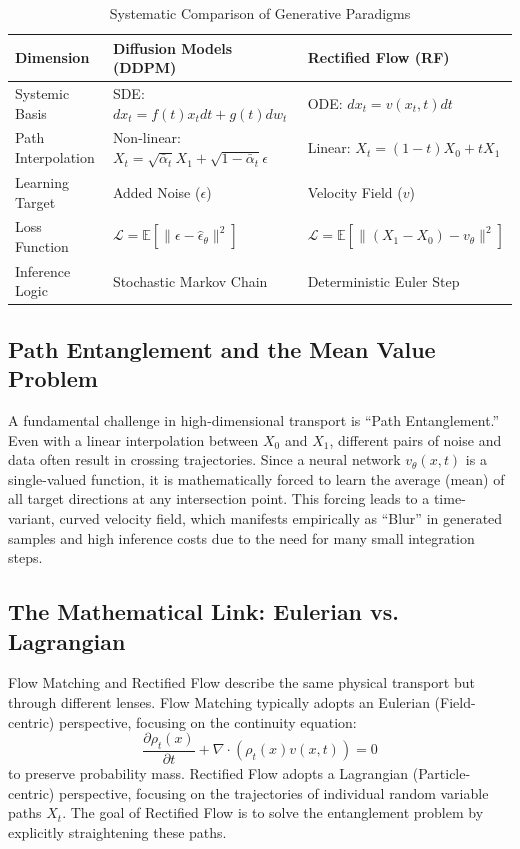 \documentclass[11pt,a4paper]{article}
\begin{document}
\begin{table}[h]
\centering
\caption{Systematic Comparison of Generative Paradigms}
\label{tab:paradigms}
\vspace{0.2cm}
\small
\begin{tabular}{lll}
\toprule
\textbf{Dimension} & \textbf{Diffusion Models (DDPM)} & \textbf{Rectified Flow (RF)} \\
\midrule
Systemic Basis & SDE: $dx_t = f(t)x_t dt + g(t)dw_t$ & ODE: $dx_t = v(x_t, t)dt$ \\
\addlinespace
Path Interpolation & Non-linear: $X_t = \sqrt{\bar{\alpha}_t} X_1 + \sqrt{1 - \bar{\alpha}_t} \epsilon$ & Linear: $X_t = (1 - t)X_0 + tX_1$ \\
\addlinespace
Learning Target & Added Noise ($\epsilon$) & Velocity Field ($v$) \\
\addlinespace
Loss Function & $\mathcal{L} = \mathbb{E} [ \| \epsilon - \hat{\epsilon}_\theta \|^2 ]$ & $\mathcal{L} = \mathbb{E} [ \| (X_1 - X_0) - v_\theta \|^2 ]$ \\
\addlinespace
Inference Logic & Stochastic Markov Chain & Deterministic Euler Step \\
\bottomrule
\end{tabular}
\end{table}

\subsection{Path Entanglement and the Mean Value Problem}
A fundamental challenge in high-dimensional transport is ``Path Entanglement.'' Even with a linear interpolation between $X_0$ and $X_1$, different pairs of noise and data often result in crossing trajectories\cite{91}. Since a neural network $v_\theta(x, t)$ is a single-valued function, it is mathematically forced to learn the average (mean) of all target directions at any intersection point\cite{91}. This forcing leads to a time-variant, curved velocity field, which manifests empirically as ``Blur'' in generated samples and high inference costs due to the need for many small integration steps\cite{91}.

\subsection{The Mathematical Link: Eulerian vs. Lagrangian}
Flow Matching and Rectified Flow describe the same physical transport but through different lenses\cite{92}. Flow Matching typically adopts an Eulerian (Field-centric) perspective, focusing on the continuity equation\cite{92}:
\begin{equation}
\frac{\partial \rho_t(x)}{\partial t} + \nabla \cdot (\rho_t(x)v(x, t)) = 0
\end{equation}
to preserve probability mass\cite{92}. Rectified Flow adopts a Lagrangian (Particle-centric) perspective, focusing on the trajectories of individual random variable paths $X_t$\cite{92}. The goal of Rectified Flow is to solve the entanglement problem by explicitly straightening these paths\cite{90}.
\end{document}
